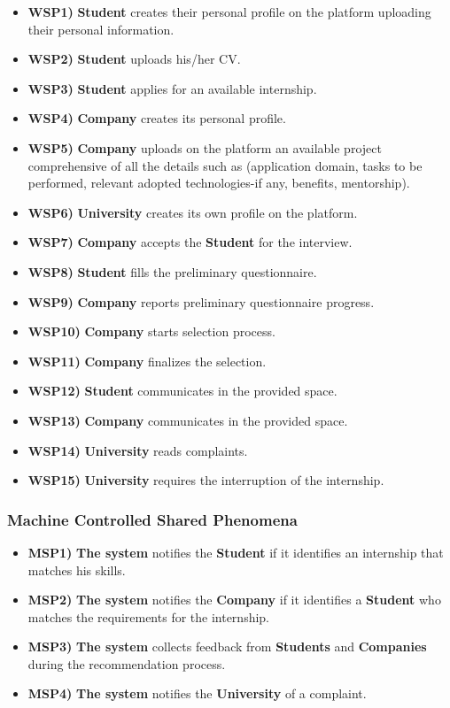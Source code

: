 \begin{itemize}
    \item \textbf{WSP1)} \textbf{Student} creates their personal profile on the platform uploading their personal information.
    \item \textbf{WSP2)} \textbf{Student} uploads his/her CV.
    \item \textbf{WSP3)} \textbf{Student} applies for an available internship.
    \item \textbf{WSP4)} \textbf{Company} creates its personal profile.
    \item \textbf{WSP5)} \textbf{Company} uploads on the platform an available project comprehensive of all the details such as (application domain, tasks to be performed, relevant adopted technologies-if any, benefits, mentorship).
    \item \textbf{WSP6)} \textbf{University} creates its own profile on the platform.
    \item \textbf{WSP7)} \textbf{Company} accepts the \textbf{Student} for the interview.
    \item \textbf{WSP8)} \textbf{Student} fills the preliminary questionnaire.
    \item \textbf{WSP9)} \textbf{Company} reports preliminary questionnaire progress.
    \item \textbf{WSP10)} \textbf{Company} starts selection process.
    \item \textbf{WSP11)} \textbf{Company} finalizes the selection.
    \item \textbf{WSP12)} \textbf{Student} communicates in the provided space.
    \item \textbf{WSP13)} \textbf{Company} communicates in the provided space.
    \item \textbf{WSP14)} \textbf{University} reads complaints.
    \item \textbf{WSP15)} \textbf{University} requires the interruption of the internship.
\end{itemize}

\subsubsection{Machine Controlled Shared Phenomena}

\begin{itemize}
    \item \textbf{MSP1)} \textbf{The system} notifies the \textbf{Student} if it identifies an internship that matches his skills.
    \item \textbf{MSP2)} \textbf{The system} notifies the \textbf{Company} if it identifies a \textbf{Student} who matches the requirements for the internship.
    \item \textbf{MSP3)} \textbf{The system} collects feedback from \textbf{Students} and \textbf{Companies} during the recommendation process.
    \item \textbf{MSP4)} \textbf{The system} notifies the \textbf{University} of a complaint.
\end{itemize}

